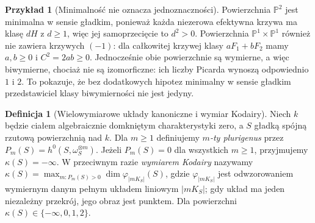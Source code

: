 \documentclass[11pt,a4paper,openany]{report}
\numberwithin{equation}{section}
\theoremstyle{plain}
\theoremstyle{definition}
\newtheorem{definicja}[twierdzenie]{Definicja}
\newtheorem{przyklad}[twierdzenie]{Przykład}
\theoremstyle{remark}
\newcommand{\PP}{\mathbb P}
\begin{document}
\begin{przyklad}[Minimalność nie oznacza jednoznaczności]
Powierzchnia $\PP^2$ jest minimalna w sensie gładkim,
ponieważ każda niezerowa efektywna krzywa ma
klasę $dH$ z $d\ge1$, więc jej samoprzecięcie
to $d^2>0$. Powierzchnia
$\PP^1\times\PP^1$ również nie zawiera krzywych
$(-1)$: dla całkowitej krzywej klasy $aF_1+bF_2$
mamy $a,b\ge0$ i $C^2=2ab\ge0$.
Jednocześnie obie powierzchnie są wymierne, a więc
biwymierne, chociaż nie są izomorficzne:
ich liczby Picarda wynoszą odpowiednio $1$ i $2$.
To pokazuje, że bez dodatkowych hipotez
minimalny w sensie gładkim przedstawiciel klasy
biwymierności nie jest jedyny.
\end{przyklad}

\begin{definicja}[Wielowymiarowe układy kanoniczne i wymiar Kodairy]
\label{def:ga8-kodaira}
Niech $k$ będzie ciałem algebraicznie domkniętym
charakterystyki zero, a $S$ gładką spójną rzutową
powierzchnią nad $k$. Dla $m\ge1$ definiujemy \emph{$m$-ty
plurigenus} przez $P_m(S)=h^0(S,\omega_S^{\otimes m})$.
Jeżeli $P_m(S)=0$ dla wszystkich $m\ge1$, przyjmujemy
$\kappa(S)=-\infty$. W przeciwnym razie
\emph{wymiarem Kodairy} nazywamy
$\kappa(S)=\max_{m:P_m(S)>0}\dim \varphi_{|mK_S|}(S)$,
gdzie $\varphi_{|mK_S|}$ jest odwzorowaniem wymiernym
danym pełnym układem liniowym $|mK_S|$; gdy układ
ma jeden niezależny przekrój, jego obraz jest punktem.
Dla powierzchni $\kappa(S)\in\{-\infty,0,1,2\}$.
\end{definicja}
\end{document}
